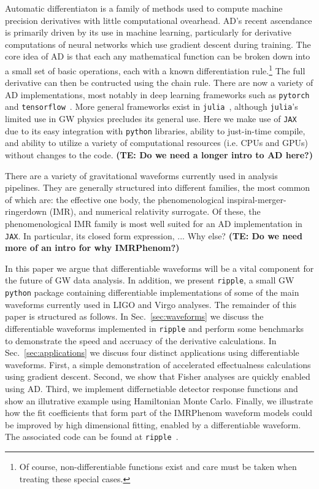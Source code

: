\documentclass[twocolumn]{aastex631}
\newcommand{\jax}{\texttt{JAX}\xspace}
\newcommand{\ripple}{\texttt{ripple}\xspace}
\newcommand{\TE}[1]{{\color{pyGreen} #1}}
\newcommand{\te}[1]{\textbf{\color{pyGreen}(TE: #1)}}
\begin{document}
Automatic differentiaton is a family of methods used to compute machine precision derivatives with little computational ovearhead. 
AD's recent ascendance is primarily driven by its use in machine learning, particularly for derivative computations of neural networks which use gradient descent during training.
The core idea of AD is that each any mathematical function can be broken down into a small set of basic operations, each with a known differentiation rule.\footnote{
    Of course, non-differentiable functions exist and care must be taken when treating these special cases.
    }
The full derivative can then be contructed using the chain rule.
There are now a variety of AD implementations, most notably in deep learning frameworks such as \texttt{pytorch}~\citep{pytorch} and \texttt{tensorflow}~\citep{tensorflow2015-whitepaper}.
More general frameworks exist in \texttt{julia}~\citep{zygote, forwarddiff}, although \texttt{julia}'s limited use in GW physics precludes its general use.
Here we make use of \jax~\citep{jax2018github} due to its easy integration with \texttt{python} libraries, ability to just-in-time compile, and ability to utilize a variety of computational resources (i.e. CPUs and GPUs) without changes to the code.
\te{Do we need a longer intro to AD here?}

There are a variety of gravitational waveforms currently used in analysis pipelines.
They are generally structured into different families, the most common of which are: the effective one body, the phenomenological inspiral-merger-ringerdown (IMR), and numerical relativity surrogate.
Of these, the phenomenological IMR family is most well suited for an AD implementation in \jax.
In particular, its closed form expression, ... \TE{Why else?}
\te{Do we need more of an intro for why IMRPhenom?}


In this paper we argue that differentiable waveforms will be a vital component for the future of GW data analysis.
In addition, we present \ripple, a small GW \texttt{python} package containing differentiable implementations of some of the main waveforms currently used in LIGO and Virgo analyses. 
The remainder of this paper is structured as follows. 
In Sec.~\ref{sec:waveforms} we discuss the differentiable waveforms implemented in \ripple and perform some benchmarks to demonstrate the speed and accruacy of the derivative calculations. 
In Sec.~\ref{sec:applications} we discuss four distinct applications using differentiable waveforms. 
First, a simple demonstration of accelerated effectualness calculations using gradient descent.
Second, we show that Fisher analyses are quickly enabled using AD.
Third, we implement differnetiable detector response functions and show an illutrative example using Hamiltonian Monte Carlo.
Finally, we illustrate how the fit coefficients that form part of the IMRPhenom waveform models could be improved by high dimensional fitting, enabled by a differentiable waveform. 
The associated code can be found at \ripple~\citep{ripple}.
\end{document}
